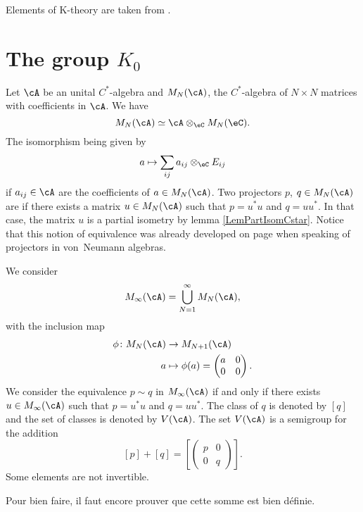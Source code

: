 Elements of K-theory are taken from \cite{VB_and_K,Landi}.

%
   \section{The group \texorpdfstring{$K_0$}{K0}}
%

Let $\cA$ be an unital $C^*$-algebra and $ M_N(\cA)$, the $C^*$-algebra of $N\times N$ matrices with coefficients in $\cA$. We have
\begin{equation}
 M_N(\cA)\simeq \cA\otimes_{\eC} M_N(\eC).
\end{equation}
The isomorphism being given by
\[ 
  a\mapsto \sum_{ij}a_{ij}\otimes_{\eC}E_{ij}
\]
if $a_{ij}\in\cA$ are the coefficients of $a\in M_N(\cA)$. Two projectors $p$, $q\in M_N(\cA)$ are  if there exists a matrix $u\in M_N(\cA)$ such that $p=u^*u$ and $q=uu^*$. In that case, the matrix $u$ is a partial isometry by lemma \ref{LemPartIsomCstar}. Notice that this notion of equivalence was already developed on page \pageref{PgEaivVNMurray} when speaking of projectors in von~Neumann algebras.

We consider 
\[ 
  M_{\infty}(\cA)=\bigcup_{N=1}^{\infty}M_N(\cA),
\]
with the inclusion map
\begin{equation}
\begin{aligned}
 \phi\colon M_N(\cA)&\to M_{N+1}(\cA) \\ 
a&\mapsto \phi(a)=
\begin{pmatrix}
a&0\\
0&0
\end{pmatrix}. 
\end{aligned}
\end{equation}
We consider the equivalence $p\sim q$ in $M_{\infty}(\cA)$ if and only if there exists $u\in M_{\infty}(\cA)$ such that $p=u^*u$ and $q=uu^*$. The class of $q$ is denoted by $[q]$ and the set of classes is denoted by $V(\cA)$. The set $V(\cA)$ is a semigroup for the addition
\[ 
  [p]+[q]=
\left[
\begin{pmatrix}
p&0\\
0&q
\end{pmatrix}
\right].
\]
Some elements are not invertible.

\begin{probleme}
Pour bien faire, il faut encore prouver que cette somme est bien définie.
\end{probleme}


